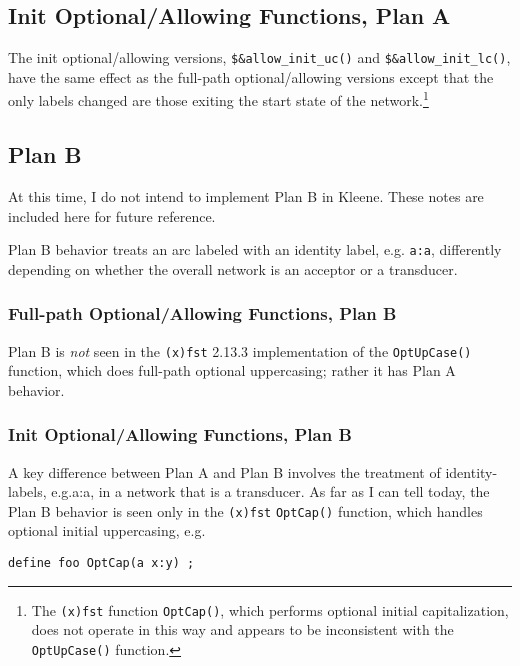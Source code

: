 \documentclass[letterpaper,12pt]{article}
\begin{document}
\subsection{Init Optional/Allowing Functions, Plan A}

The init optional/allowing versions, \verb!$&allow_init_uc()! and \verb!$&allow_init_lc()!,
have the same effect as the full-path optional/allowing versions except that the only
labels changed are those exiting the start state of the
network.\footnote{The \texttt{(x)fst} function \texttt{OptCap()}, which
performs optional initial capitalization, does not operate in this way and
appears to be inconsistent with the \texttt{OptUpCase()} function.}

\subsection{Plan B}

At this time, I do not intend to implement Plan B in Kleene.  These notes are
included here for future reference.

Plan B behavior treats an arc labeled with an identity label, e.g.\@ 
\texttt{a:a}, differently depending on whether the overall network is an
acceptor or a transducer.

\subsubsection{Full-path Optional/Allowing Functions, Plan B}

Plan B is \emph{not} seen in the \texttt{(x)fst} 2.13.3 implementation of the
\texttt{OptUpCase()} function, which does full-path optional uppercasing;
rather it has Plan A behavior.

\subsubsection{Init Optional/Allowing Functions, Plan B}

A key difference between Plan A and Plan B involves the treatment of
identity-labels, e.g.\@ a:a, in a network that is a transducer.  As far as I
can tell today, the Plan B behavior is seen only in the \texttt{(x)fst}
\texttt{OptCap()} function, which handles optional initial uppercasing, e.g.\@

\begin{Verbatim}[fontsize=\small]
define foo OptCap(a x:y) ;
\end{Verbatim}
\end{document}

